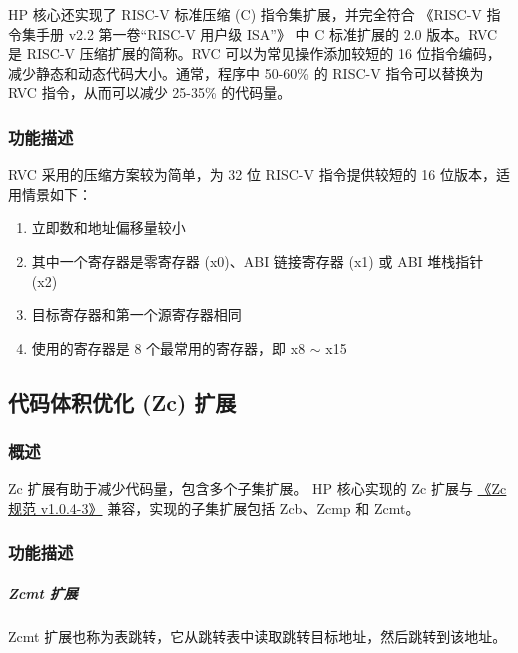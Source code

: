 \documentclass[main\_\_CN.tex]{subfiles}
\begin{document}
HP 核心还实现了 RISC-V 标准压缩 (C) 指令集扩展，并完全符合 《RISC-V 指令集手册 v2.2 第一卷“RISC-V 用户级 ISA”》 中 C 标准扩展的 2.0 版本。RVC 是 RISC-V 压缩扩展的简称。RVC 可以为常见操作添加较短的 16 位指令编码，减少静态和动态代码大小。通常，程序中 50-60\% 的 RISC-V 指令可以替换为 RVC 指令，从而可以减少 25-35\% 的代码量。

\subsubsection{功能描述}
\label{sec:riscvcpu-cext-func-descr}
RVC 采用的压缩方案较为简单，为 32 位 RISC-V 指令提供较短的 16 位版本，适用情景如下：
\begin{enumerate}
    \item 立即数和地址偏移量较小
    \item 其中一个寄存器是零寄存器 (x0)、ABI 链接寄存器 (x1) 或 ABI 堆栈指针 (x2)
    \item 目标寄存器和第一个源寄存器相同
    \item 使用的寄存器是 8 个最常用的寄存器，即 x8 $\sim$ x15
\end{enumerate}

\newpage


\newpage
\subsection{代码体积优化 (Zc) 扩展}
\label{sec:riscvcpu-zc}

\subsubsection{概述}
\label{sec:riscvcpu-zc-overview}

Zc 扩展有助于减少代码量，包含多个子集扩展。\chipname{} HP 核心实现的 Zc 扩展与 \href{https://github.com/riscvarchive/riscv-code-size-reduction/blob/v1.0.4-3/Zc-specification/Zc.adoc}{《Zc 规范 v1.0.4-3》} 兼容，实现的子集扩展包括 Zcb、Zcmp 和 Zcmt。

\subsubsection{功能描述}
\label{sec:riscvcpu-zc-func-descr}






\subparagraph{Zcmt 扩展}

Zcmt 扩展也称为表跳转，它从跳转表中读取跳转目标地址，然后跳转到该地址。
\end{document}
